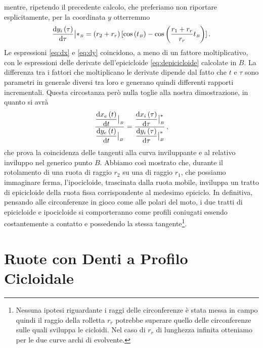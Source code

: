 \noindent mentre, ripetendo il precedente calcolo, che preferiamo non riportare
esplicitamente, per la coordinata $y$ otterremmo
\begin{equation}
\dfrac{{\rm d}{y_i}\left(\tau\right)}{{\rm d}\tau}\bigr|*_{\scriptscriptstyle B} = 
\left(r_2+r_r\right)[\cos\left(t_{\scriptscriptstyle B}\right) -
\cos\left(\dfrac{r_1+r_r}{r_r}t_{\scriptscriptstyle B}\right)]\,.
\label{eq:dy}
\end{equation}
\noindent Le espressioni \ref{eq:dx} e \ref{eq:dy} coincidono, a meno di
un fattore moltiplicativo, con le espressioni
delle derivate dell'epicicloide \ref{eq:depicicloide} calcolate in $B$.
La differenza tra i fattori che moltiplicano le derivate
dipende dal fatto che $t$ e $\tau$ sono parametri in generale diversi tra
loro e generano quindi differenti rapporti incrementali.
Questa circostanza per\`o nulla toglie alla nostra dimostrazione, in quanto si
avr\`a
\begin{equation}
\dfrac{\dfrac{{\rm d}{x_e}\left(t\right)}{{\rm d}t}\bigr|_{\scriptscriptstyle B}}{\dfrac{{\rm d}{y_e}\left(t\right)}{{\rm d}t}\bigr|_{\scriptscriptstyle B}} =
\dfrac{\dfrac{{\rm d}{x_i}\left(\tau\right)}{{\rm d}\tau}\bigr|^*_{\scriptscriptstyle B}}
{\dfrac{{\rm d}{y_i}\left(\tau\right)}{{\rm d}\tau}\bigr|^*_{\scriptscriptstyle B}} \,,
\label{eq:dtot}
\end{equation}
\noindent che prova la coincidenza delle tangenti alla curva inviluppante e
al relativo inviluppo nel generico punto $B$.
Abbiamo cos\`i mostrato che, durante il rotolamento di una ruota di
raggio $r_2$ su una di raggio $r_1$, che possiamo immaginare ferma,
l'ipocicloide, trascinata dalla ruota mobile, inviluppa un tratto di epicicloide
della ruota fissa corrispondente al medesimo epiciclo.
In definitiva, pensando alle circonferenze in gioco come alle polari del moto,
i due tratti di epicicloide e ipocicloide si comporteranno come profili
coniugati essendo costantemente a contatto e possedendo la stessa
tangente\footnote{
Nessuna ipotesi riguardante i raggi delle circonferenze \`e stata messa in campo
quindi il raggio della rolletta $r_r$ potrebbe superare quello delle
circonferenze sulle quali sviluppa le cicloidi. Nel caso di
 $r_r$ di lunghezza infinita otteniamo per le due curve archi di evolvente.
}.

\section{Ruote con Denti a Profilo Cicloidale}

